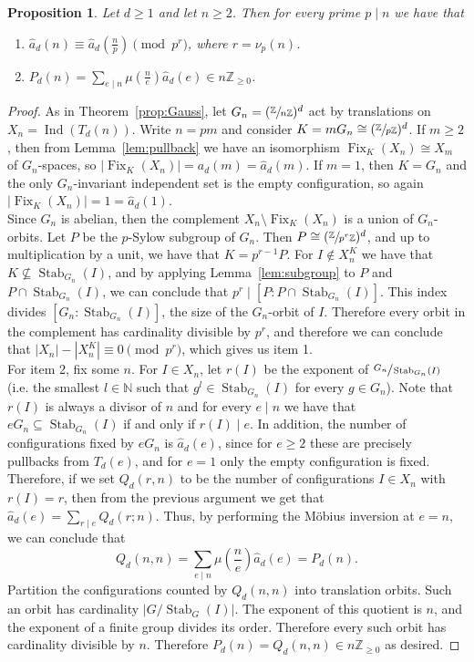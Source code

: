 \documentclass{article}
\theoremstyle{plain}
\newtheorem{proposition}[theorem]{Proposition}
\theoremstyle{definition}
\theoremstyle{remark}
\newcommand{\Z}{\mathbb{Z}}
\DeclareMathOperator{\Fix}{Fix}
\DeclareMathOperator{\Stab}{Stab}
\DeclareMathOperator{\Ind}{Ind}
\begin{document}
\begin{proposition}\label{thm:full-dold}
Let $d\ge1$ and let $n\ge2$. Then for every prime $p \mid n$  we have that 
\begin{enumerate}
    \item $\widehat a_d(n)\equiv\widehat a_d(\frac{n}{p})\pmod{p^{r}}$, where $r={\nu_p(n)}$. 
    \item $P_d(n)=\sum_{e\mid n}\mu(\frac{n}{e})\widehat a_d(e)
\in n\Z_{\ge0}$. 
\end{enumerate}
\end{proposition}


\begin{proof}
As in Theorem~\ref{prop:Gauss}, let $G_n=(\sfrac{\Z}{n\Z})^d$ act by translations on
$X_n=\Ind(T_d(n))$. Write $n=pm$ and consider $K=mG_n\cong(\sfrac{\Z}{p\Z})^d$. If $m\ge2$, then from Lemma~\ref{lem:pullback} we have an isomorphism $\Fix_K(X_n)\cong X_m$ of $G_n$-spaces, so $|\Fix_K(X_n)|=a_d(m)=\widehat a_d(m)$. If $m=1$, then $K=G_n$ and the only $G_n$-invariant independent set is the empty configuration, so again $|\Fix_K(X_n)|=1=\widehat a_d(1)$. \\

Since $G_n$ is abelian, then the complement $X_n \setminus \Fix_K(X_n)$ is a union of $G_n$-orbits. Let $P$ be the $p$-Sylow subgroup of $G_n$. Then $P\cong(\sfrac{\Z}{p^r\Z})^d$, and up to multiplication by a unit, we have that  $K=p^{r-1}P$. For $I\notin X_n^K$ we have that $K\nsubseteq\Stab_{G_n}(I)$, and by applying Lemma~\ref{lem:subgroup} to $P$ and $P\cap\Stab_{G_n}(I)$, we can conclude that $p^r\mid[P:P\cap\Stab_{G_n}(I)]$.  This index divides $[G_n:\Stab_{G_n}(I)]$, the size of the $G_n$-orbit of $I$. Therefore every orbit in the complement has cardinality divisible by $p^r$, and therefore we can conclude that $|X_n|-|X_n^K|\equiv0\pmod{p^r}$, which gives us item 1.\\


For item 2, fix some $n$. For $I\in X_n$, let $r(I)$ be the exponent of $\sfrac{G_n}{\Stab_{G_n}(I)}$ (i.e. the smallest $l \in \mathbb{N}$ such that $g^l \in \Stab_{G_n}(I)$ for every $g \in G_n$). Note that $r(I)$ is always a divisor of $n$ and for every $e\mid n$ we have that $eG_n\subseteq\Stab_{G_n}(I)$ if and only if $r(I)\mid e$. In addition, the number of configurations fixed by $eG_n$ is $\widehat a_d(e)$, since for $e\ge2$ these are precisely pullbacks from $T_d(e)$, and for $e=1$ only the empty configuration is fixed. Therefore, if we set $Q_d(r,n)$ to be the number of configurations $I\in X_n$ with $r(I)=r$, then from the previous argument we get that $\widehat a_d(e)=\sum_{r\mid e}Q_d(r;n)$.  Thus, by performing the Möbius inversion at $e=n$, we can conclude that
\[
Q_d(n,n)=\sum_{e\mid n}\mu\left(\frac{n}{e}\right)\widehat a_d(e)=P_d(n).
\]
Partition the configurations counted by $Q_d(n,n)$ into translation orbits. Such an orbit has cardinality $|G/\Stab_G(I)|$. The exponent of this quotient is $n$, and the exponent of a finite group divides its order. Therefore every such orbit has cardinality divisible by $n$. Therefore $P_d(n)=Q_d(n,n)\in n\Z_{\ge0}$ as desired. 
\end{proof}
\end{document}
